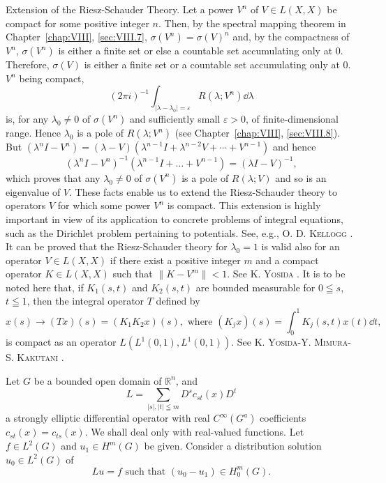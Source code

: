 Extension of the Riesz-Schauder Theory. Let a power $V^{n}$ of $V \in L(X, X)$ be compact for some positive integer $n$. Then, by the spectral mapping theorem in Chapter~\ref{chap:VIII}, \ref{sec:VIII.7}, $\sigma(V^{n}) = \sigma(V)^{n}$ and, by the compactness of $V^{n}$, $\sigma(V^{n})$ is either a finite set or else a countable set accumulating only at $0$. Therefore, $\sigma(V)$ is either a finite set or a countable set accumulating 
only at $0$. $V^n$ being compact, 
\[
(2 \pi i) ^{-1} \int_ {| \lambda - \lambda_{0} | = \varepsilon} R (\lambda ; V ^{n}) \dd \lambda
\]
is, for any $\lambda_0 \neq 0$ of $\sigma(V^n)$ and sufficiently small $\varepsilon > 0$, of finite-dimensional range. Hence $\lambda_0$ is a pole of $R(\lambda; V^n)$ (see Chapter~\ref{chap:VIII}, \ref{sec:VIII.8}). But $(\lambda^n I - V^n) = (\lambda - V)(\lambda^{n-1}I + \lambda^{n-2}V + \cdots + V^{n-1})$ and hence 
\[
(\lambda^{n} I - V ^{n}) ^{-1} (\lambda^{n-1} I + \dots + V ^{n-1}) = (\lambda I - V) ^{-1},
\]
which proves that any $\lambda_0 \neq 0$ of $\sigma(V^n)$ is a pole of $R(\lambda; V)$ and so is an eigenvalue of $V$. These facts enable us to extend the Riesz-Schauder theory to operators $V$ for which some power $V^n$ is compact. This extension is highly important in view of its application to concrete problems of integral equations, such as the Dirichlet problem pertaining to potentials. See, e.g., O. D. \textsc{Kellogg} \cite{kellogg148}. It can be proved that the Riesz-Schauder theory for $\lambda_0 = 1$ is valid also for an operator $V \in L(X, X)$ if there exist a positive integer $m$ and a compact operator $K \in L(X, X)$ such that $\|K - V^m\| < 1$. See K. \textsc{Yosida} \cite{yosida352}. It is to be noted here that, if $K_1(s, t)$ and $K_2(s, t)$ are bounded measurable for $0 \leqq s$, $t \leqq 1$, then the integral operator $T$ defined by 
\[
x (s) \rightarrow (T x) (s) = \left(K _{1} K _{2} x\right) (s), \text{ where } \left(K _{j} x\right) (s) = \int_{0} ^{1} K _{j} (s, t) x (t) \dd t,
\]
is compact as an operator $L(L^{1}(0,1),L^{1}(0,1))$. See K. \textsc{Yosida}-Y. \textsc{Mimura}-S. \textsc{Kakutani} \cite{yosida353}. 


\label{sec:X.6}

Let $G$ be a bounded open domain of $\mathbb{R}^{n}$, and 
\[
L = \sum\limits_{| s |, | t | \leqq m} D ^{s} c _{st} (x) D ^{t}
\]
a strongly elliptic differential operator with real $C^\infty(G^a)$ coefficients $c_{st}(x) = c_{ts}(x)$. We shall deal only with real-valued functions. Let $f \in L^2(G)$ and $u_1 \in H^m(G)$ be given. Consider a distribution solution $u_0 \in L^2(G)$ of 
\begin{equation}\label{eq:X.6.1}
L u = f \text{ such that } (u _{0} - u _{1}) \in H _{0} ^{m} (G).
\end{equation}

